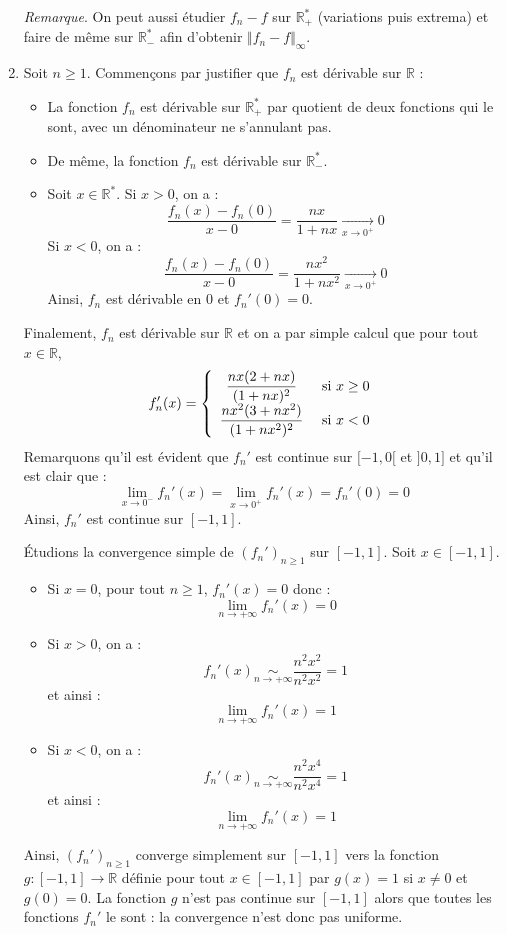\documentclass[a4paper,twoside,french,11pt]{VcCours}
\begin{document}
\begin{enumerate}
\medskip

\textit{Remarque}. On peut aussi étudier $f_n-f$ sur $\mathbb{R}_+^{*}$ (variations puis extrema) et faire de même sur $\mathbb{R}_{-}^*$ afin d'obtenir $\Vert f_n-f \Vert_{\infty}$.

\medskip

\item Soit $n \geq 1$. Commençons par justifier que $f_n$ est dérivable sur $\mathbb{R}$ :
\begin{itemize}
\item La fonction $f_n$ est dérivable sur $\mathbb{R}_+^{*}$ par quotient de deux fonctions qui le sont, avec un dénominateur ne s'annulant pas.
\item De même, la fonction $f_n$ est dérivable sur $\mathbb{R}_{-}^{*}$.
\item Soit $x \in \mathbb{R}^*$. Si $x>0$, on a :
$$ \dfrac{f_n(x)-f_n(0)}{x-0} = \dfrac{nx}{1+nx} \underset{x \rightarrow 0^{+}}{\longrightarrow} 0$$
Si $x<0$, on a :
$$ \dfrac{f_n(x)-f_n(0)}{x-0} = \dfrac{nx^2}{1+nx^2} \underset{x \rightarrow 0^{+}}{\longrightarrow} 0$$
Ainsi, $f_n$ est dérivable en $0$ et $f_n'(0)=0$.
\end{itemize}

\medskip

Finalement, $f_n$ est dérivable sur $\mathbb{R}$ et on a par simple calcul que pour tout $x \in \mathbb{R}$,
$$ f_n'(x)  = \left\lbrace \begin{array}{cl}
\dfrac{nx(2+nx)}{(1+nx)^2} & \hbox{ si } x \geq 0 \\
\dfrac{nx^2(3+nx^2)}{(1+nx^2)^2} & \hbox{ si }x  < 0 \\
\end{array}\right.$$
Remarquons qu'il est évident que $f_n'$ est continue sur $[-1,0[$ et $]0,1]$ et qu'il est clair que :
$$ \lim_{x \rightarrow 0^{-}} f_n'(x) = \lim_{x \rightarrow 0^{+}} f_n'(x) = f_n'(0)=0$$
Ainsi, $f_n'$ est continue sur $[-1,1]$.

\medskip

Étudions la convergence simple de $(f_n')_{n \geq 1}$ sur $[-1,1]$. Soit $x \in [-1,1]$.
\begin{itemize}
\item Si $x=0$, pour tout $n \geq 1$, $f_n'(x)=0$ donc :
$$ \lim_{n \rightarrow + \infty} f_n'(x)=0$$
\item Si $x>0$, on a :
$$ f_n'(x) \underset{n \rightarrow + \infty}{\sim} \dfrac{n^2x^2}{n^2x^2} = 1$$
et ainsi :
$$ \lim_{n \rightarrow + \infty} f_n'(x)=1$$
\item Si $x<0$, on a :
$$ f_n'(x) \underset{n \rightarrow + \infty}{\sim} \dfrac{n^2x^4}{n^2x^4} = 1$$
et ainsi :
$$ \lim_{n \rightarrow + \infty} f_n'(x)=1$$
\end{itemize}
Ainsi, $(f_n')_{n \geq 1}$ converge simplement sur $[-1,1]$ vers la fonction $g : [-1,1] \rightarrow \mathbb{R}$ définie pour tout $x \in [-1,1]$ par $g(x)=1$ si $x \neq 0$ et $g(0)=0$. La fonction $g$ n'est pas continue sur $[-1,1]$ alors que toutes les fonctions $f_n'$ le sont : la convergence n'est donc pas uniforme.
\end{enumerate}
\end{document}
